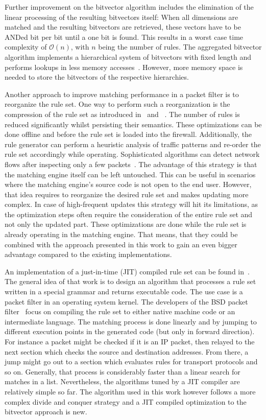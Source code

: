 \documentclass[conference]{IEEEtran}
\begin{document}
Further improvement on the bitvector algorithm includes the elimination of the linear processing of the resulting bitvectors itself:
When all dimensions are matched and the resulting bitvectors are retrieved, 
these vectors have to be ANDed bit per bit until a one bit is found.
This results in a worst case time complexity of $\mathcal O(n)$, with $n$ being the number of rules.
The aggregated bitvector algorithm implements a hierarchical system 
of bitvectors with fixed length and performs lookups in less memory accesses~\cite{abv}.
However, more memory space is needed to store the bitvectors of the respective hierarchies.

Another approach to improve matching performance in a packet filter is to reorganize the rule set.
One way to perform such a reorganization is the compression of the rule set as 
introduced in~\cite{redundancy_removal} and ~\cite{firewall_compressor}.
The number of rules is reduced significantly whilst persisting their semantics.
These optimizations can be done offline and before the rule set is loaded into the firewall.
Additionally, the rule generator can perform a heuristic analysis of  
traffic patterns and re-order the rule set accordingly while operating.
Sophisticated algorithms can detect network flows after inspecting only a few packets~\cite{trafficonthefly}.
The advantage of this strategy is that the matching engine itself can be left untouched.
This can be useful in scenarios where the matching engine's source code is not open to the end user.
However, that idea requires to reorganize the desired rule set and makes updating more complex.
In case of high-frequent updates this strategy will hit its limitations, 
as the optimization steps often require the consideration of the entire rule set and not only the updated part.
These optimizations are done while the rule set is already operating in 
the matching engine.
That means, that they could be combined with the approach presented in this work to
gain an even bigger advantage compared to the existing implementations.

An implementation of a just-in-time (JIT) compiled rule set can be found in~\cite{dpf}.
The general idea of that work is to design an algorithm that processes a rule set
written in a special grammar and returns executable code.
The use case is a packet filter in an operating system kernel.
The developers of the BSD packet filter~\cite{bpf,bpfplus} focus on compiling the rule set to 
either native machine code or an intermediate language.
The matching process is done linearly and by jumping to different execution 
points in the generated code (but only in forward direction).
For instance a packet might be checked if it is an IP packet, then relayed 
to the next section which checks the source and destination addresses.
From there, a jump might go out to a section which evaluates rules for transport protocols and so on.
Generally, that process is considerably faster than a linear search for matches in a list.
Nevertheless, the algorithms tuned by a JIT compiler are relatively simple so far.
The algorithm used in this work however follows a more complex divide and conquer strategy and a JIT compiled optimization 
to the bitvector approach is new.
\end{document}
